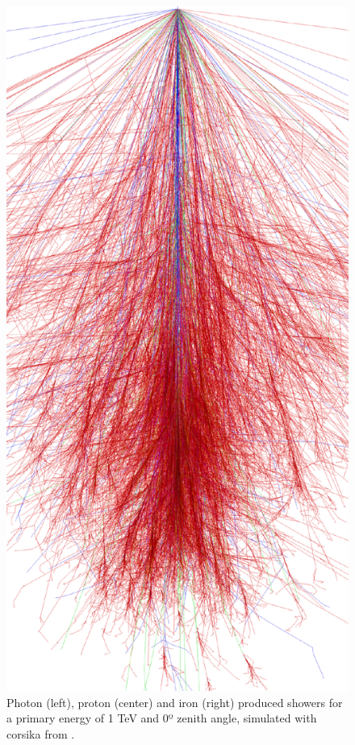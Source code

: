 \documentclass[main.tex]{subfiles}
\begin{document}
\begin{figure}[!htb]
  \includegraphics[width=\linewidth]{Pictures/iron_12_0deg.pdf}
  \endminipage\hfill
  \caption{\label{fig:corsika} Photon (left), proton (center) and iron (right) produced showers for a primary energy of 1 TeV and 0º zenith angle, simulated with \gls{corsika} from \cite{corsikaimages}.}
\end{figure}
\end{document}
